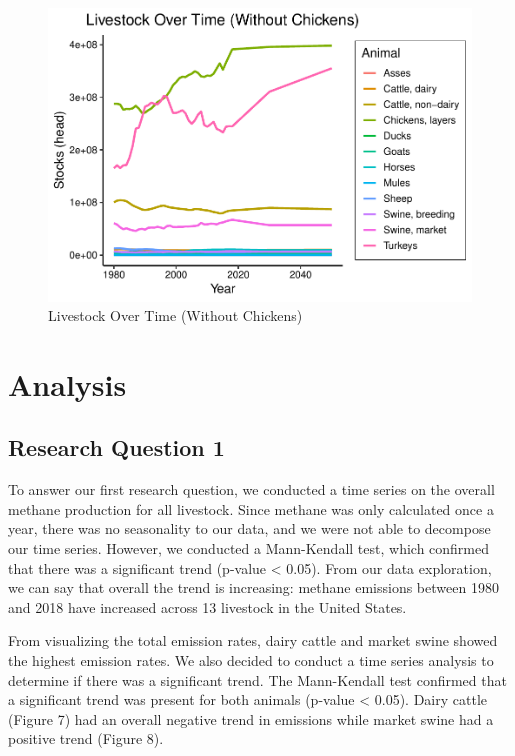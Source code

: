 \documentclass[
  12pt,
]{article}
\begin{document}
\begin{figure}
\centering
\includegraphics{Methane_Project_Template_files/figure-latex/no.chix-1.pdf}
\caption{Livestock Over Time (Without Chickens)}
\end{figure}

\newpage

\hypertarget{analysis}{%
\section{Analysis}\label{analysis}}

\hypertarget{research-question-1}{%
\subsection{Research Question 1}\label{research-question-1}}

To answer our first research question, we conducted a time series on the
overall methane production for all livestock. Since methane was only
calculated once a year, there was no seasonality to our data, and we
were not able to decompose our time series. However, we conducted a
Mann-Kendall test, which confirmed that there was a significant trend
(p-value \textless{} 0.05). From our data exploration, we can say that
overall the trend is increasing: methane emissions between 1980 and 2018
have increased across 13 livestock in the United States.

From visualizing the total emission rates, dairy cattle and market swine
showed the highest emission rates. We also decided to conduct a time
series analysis to determine if there was a significant trend. The
Mann-Kendall test confirmed that a significant trend was present for
both animals (p-value \textless{} 0.05). Dairy cattle (Figure 7) had an
overall negative trend in emissions while market swine had a positive
trend (Figure 8).
\end{document}
